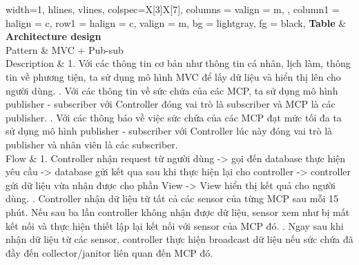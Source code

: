    	\begin{tblr}{
   			width=1\linewidth,
   			hlines,
   			vlines,
   			colspec={X[3]X[7]},
   			columns = {valign = m, },
			column{1} = {halign = c},
   			row{1} = {halign = c, valign = m, bg = lightgray, fg = black},
   		}
   		{\textbf{Table} & \textbf{Architecture design}}  \\
   		Pattern		& 	MVC + Pub-sub \\
   		Description & 	1. Với các thông tin cơ bản như thông tin cá nhân, lịch làm, thông tin về phương tiện, ta sử dụng mô hình MVC để lấy dữ liệu và hiển thị lên cho người dùng. \newline
						. Với các thông tin về sức chứa của các MCP, ta sử dụng mô hình publisher - subscriber với Controller đóng vai trò là subscriber và MCP là các publisher. \newline
						. Với các thông báo về việc sức chứa của các MCP đạt mức tối đa ta sử dụng mô hình publisher - subscriber với Controller lúc này đóng vai trò là publisher và nhân viên là các subscriber. \\
		Flow & 			1. Controller nhận request từ người dùng -> gọi đến database thực hiện yêu cầu -> database gửi kết qua sau khi thực hiện lại cho controller -> controller gửi dữ liệu vừa nhận được cho phần View -> View hiển thị kết quả cho người dùng. \newline
						. Controller nhận dữ liệu từ tất cả các sensor của từng MCP sau mỗi 15 phút. Nếu sau ba lần controller không nhận được dữ liệu, sensor xem như bị mất kết nối và thực hiện thiết lập lại kết nối với sensor của MCP đó. \newline
						. Ngay sau khi nhận dữ liệu từ các sensor, controller thực hiện broadcast dữ liệu nếu sức chứa đã đầy đến collector/janitor liên quan đến MCP đó. \\
   	\end{tblr}

   	\vspace{0.5cm}

